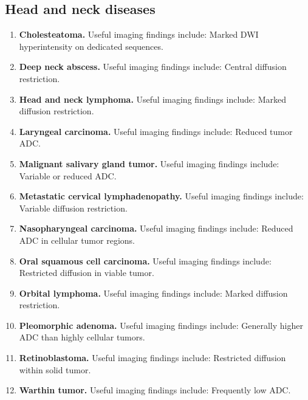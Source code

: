 \subsection{Head and neck diseases}
\begin{enumerate}[leftmargin=*,itemsep=0.45em,topsep=0.4em]
\item \textbf{Cholesteatoma.} Useful imaging findings include: Marked DWI hyperintensity on dedicated sequences.
\item \textbf{Deep neck abscess.} Useful imaging findings include: Central diffusion restriction.
\item \textbf{Head and neck lymphoma.} Useful imaging findings include: Marked diffusion restriction.
\item \textbf{Laryngeal carcinoma.} Useful imaging findings include: Reduced tumor ADC.
\item \textbf{Malignant salivary gland tumor.} Useful imaging findings include: Variable or reduced ADC.
\item \textbf{Metastatic cervical lymphadenopathy.} Useful imaging findings include: Variable diffusion restriction.
\item \textbf{Nasopharyngeal carcinoma.} Useful imaging findings include: Reduced ADC in cellular tumor regions.
\item \textbf{Oral squamous cell carcinoma.} Useful imaging findings include: Restricted diffusion in viable tumor.
\item \textbf{Orbital lymphoma.} Useful imaging findings include: Marked diffusion restriction.
\item \textbf{Pleomorphic adenoma.} Useful imaging findings include: Generally higher ADC than highly cellular tumors.
\item \textbf{Retinoblastoma.} Useful imaging findings include: Restricted diffusion within solid tumor.
\item \textbf{Warthin tumor.} Useful imaging findings include: Frequently low ADC.
\end{enumerate}


